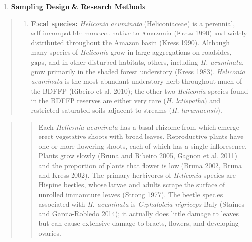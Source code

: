 \documentclass[
  12pt,
  man, donotrepeattitle]{apa6}
\providecommand{\tightlist}{%
  \setlength{\itemsep}{0pt}\setlength{\parskip}{0pt}}
\begin{document}
\begin{enumerate}
\def\labelenumi{\arabic{enumi}.}
\setcounter{enumi}{1}
\tightlist
\item
  \textbf{Sampling Design \& Research Methods}
\end{enumerate}

\begin{quote}
\begin{enumerate}
\def\labelenumi{\alph{enumi}.}
\tightlist
\item
  \textbf{Focal species:} \emph{Heliconia acuminata} (Heliconiaceae) is a perennial, self-incompatible monocot native to Amazonia (Kress 1990) and widely distributed throughout the Amazon basin (Kress 1990). Although many species of \emph{Heliconia} grow in large aggregations on roadsides, gaps, and in other disturbed habitats, others, including \emph{H. acuminata}, grow primarily in the shaded forest understory (Kress 1983). \emph{Heliconia acuminata} is the most abundant understory herb throughout much of the BDFFP (Ribeiro et al. 2010); the other two \emph{Heliconia} species found in the BDFFP reserves are either very rare (\emph{H. latispatha}) and restricted saturated soils adjacent to streams (\emph{H. tarumaensis}).
\end{enumerate}
\end{quote}

\begin{quote}
\begin{quote}
Each \emph{Heliconia acuminata} has a basal rhizome from which emerge erect vegetative shoots with broad leaves. Reproductive plants have one or more flowering shoots, each of which has a single infloresence. Plants grow slowly (Bruna and Ribeiro 2005, Gagnon et al. 2011) and the proportion of plants that flower is low (Bruna 2002, Bruna and Kress 2002). The primary herbivores of \emph{Heliconia} species are Hispine beetles, whose larvae and adults scrape the surface of unrolled immamture leaves (Strong 1977). The beetle species associated with \emph{H. acuminata} is \emph{Cephaloleia nigriceps} Baly (Staines and Garcia-Robledo 2014); it actually does little damage to leaves but can cause extensive damage to bracts, flowers, and developing ovaries.
\end{quote}
\end{quote}
\end{document}

